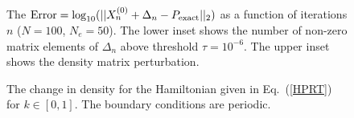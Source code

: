 \documentclass[prl,aps,twocolumn,showpacs,twocolumngrid,superbib]{revtex4}
\begin{document}
\begin{figure}
\caption{\small  The 
${\rm Error} = \log_{10}(||X^{(0)}_n + \Delta_n - P_{\rm exact}||_2)$
as a function of iterations $n$ ($N = 100$, $N_e = 50$). The lower 
inset shows the number of non-zero matrix elements of $\Delta_n$ 
above threshold $\tau = 10^{-6}$.  The upper inset shows the density matrix
perturbation.
\label{DX}}
\end{figure}

\begin{figure}
\caption{\small The change in density for the Hamiltonian
given in Eq.\ (\ref{HPRT}) for $k \in [0,1]$. The boundary 
conditions are periodic.
\label{Fig2}}
\end{figure}
\end{document}
